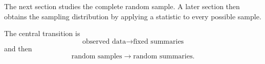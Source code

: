 The next section studies the complete random sample. A later section then obtains
the sampling distribution by applying a statistic to every possible sample.

\begin{theorembox}
The central transition is
\[
\text{observed data}\longrightarrow\text{fixed summaries}
\]
and then
\[
\text{random samples}\longrightarrow\text{random summaries}.
\]
\end{theorembox}
